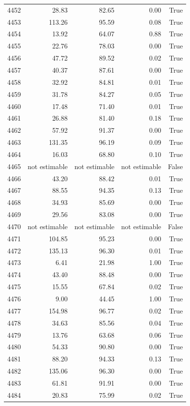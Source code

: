 \begin{longtable}{rrrrr}
4452 & 28.83 & 82.65 & 0.00 & True \\
4453 & 113.26 & 95.59 & 0.08 & True \\
4454 & 13.92 & 64.07 & 0.88 & True \\
4455 & 22.76 & 78.03 & 0.00 & True \\
4456 & 47.72 & 89.52 & 0.02 & True \\
4457 & 40.37 & 87.61 & 0.00 & True \\
4458 & 32.92 & 84.81 & 0.01 & True \\
4459 & 31.78 & 84.27 & 0.05 & True \\
4460 & 17.48 & 71.40 & 0.01 & True \\
4461 & 26.88 & 81.40 & 0.18 & True \\
4462 & 57.92 & 91.37 & 0.00 & True \\
4463 & 131.35 & 96.19 & 0.09 & True \\
4464 & 16.03 & 68.80 & 0.10 & True \\
4465 & not estimable & not estimable & not estimable & False \\
4466 & 43.20 & 88.42 & 0.01 & True \\
4467 & 88.55 & 94.35 & 0.13 & True \\
4468 & 34.93 & 85.69 & 0.00 & True \\
4469 & 29.56 & 83.08 & 0.00 & True \\
4470 & not estimable & not estimable & not estimable & False \\
4471 & 104.85 & 95.23 & 0.00 & True \\
4472 & 135.13 & 96.30 & 0.01 & True \\
4473 & 6.41 & 21.98 & 1.00 & True \\
4474 & 43.40 & 88.48 & 0.00 & True \\
4475 & 15.55 & 67.84 & 0.02 & True \\
4476 & 9.00 & 44.45 & 1.00 & True \\
4477 & 154.98 & 96.77 & 0.02 & True \\
4478 & 34.63 & 85.56 & 0.04 & True \\
4479 & 13.76 & 63.68 & 0.06 & True \\
4480 & 54.33 & 90.80 & 0.00 & True \\
4481 & 88.20 & 94.33 & 0.13 & True \\
4482 & 135.06 & 96.30 & 0.00 & True \\
4483 & 61.81 & 91.91 & 0.00 & True \\
4484 & 20.83 & 75.99 & 0.02 & True \\

\end{longtable}
